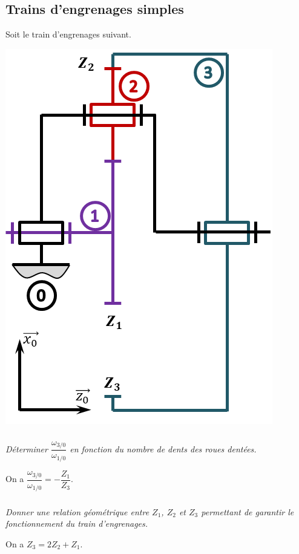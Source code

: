 \documentclass[10pt,fleqn]{article} %
\begin{document}

\vspace{5.5cm}
\pagestyle{fancy}
\thispagestyle{plain}


\def\columnseprulecolor{\color{ocre}}
\setlength{\columnseprule}{0.4pt} 

\begin{multicols}{2}


\section*{ Trains d'engrenages simples}
\setcounter{exo}{0}

\ifprof
\else
Soit le train d'engrenages suivant. 
\begin{center}
\includegraphics[width=.7\linewidth]{images/TrainSimple_01}
\end{center}
\fi

\subparagraph{}
\textit{Déterminer $\dfrac{\omega_{3/0}}{\omega_{1/0}}$ en fonction du nombre de dents des roues dentées.}
\ifprof
\begin{corrige}
On a $\dfrac{\omega_{3/0}}{\omega_{1/0}}=-\dfrac{Z_1}{Z_3}$.
\end{corrige}
\else
\fi

\subparagraph{}
\textit{Donner une relation géométrique entre $Z_1$, $Z_2$ et $Z_3$ permettant de garantir le fonctionnement du train d'engrenages. }
\ifprof
\begin{corrige}
On a $Z_3 = 2Z_2 + Z_1$.
\end{corrige}
\else
\fi




\end{multicols}
\end{document}
